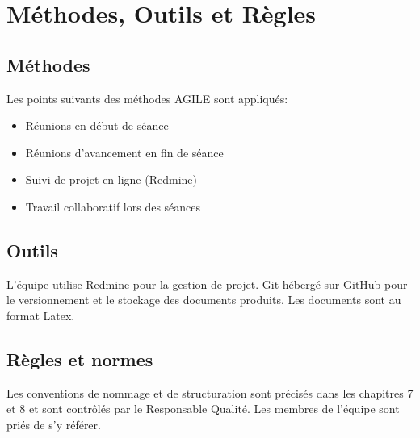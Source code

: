 \section{Méthodes, Outils et Règles}

\subsection{Méthodes}
Les points suivants des méthodes AGILE sont appliqués:
\begin{itemize}
\item Réunions en début de séance
\item Réunions d'avancement en fin de séance
\item Suivi de projet en ligne (Redmine)
\item Travail collaboratif lors des séances
\end{itemize}

\subsection{Outils}
L'équipe utilise Redmine pour la gestion de projet. Git hébergé sur GitHub pour le versionnement et le stockage
des documents produits. Les documents sont au format Latex.
\subsection{Règles et normes}
Les conventions de nommage et de structuration sont précisés dans les chapitres 7 et 8 et sont contrôlés
par le Responsable Qualité. Les membres de l'équipe sont priés de s'y référer.
\pagebreak
